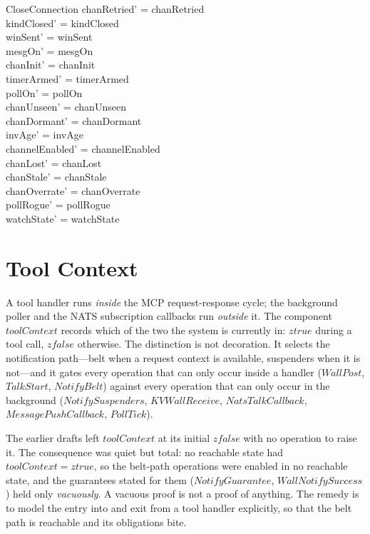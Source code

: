 \documentclass[a4paper,10pt,fleqn]{article}
\begin{document}
\begin{schema}{CloseConnection}
  chanRetried' = chanRetried \\
  kindClosed' = kindClosed \\
  winSent' = winSent \\
  mesgOn' = mesgOn \\
  chanInit' = chanInit \\
  timerArmed' = timerArmed \\
  pollOn' = pollOn \\
  chanUnseen' = chanUnseen \\
  chanDormant' = chanDormant \\
  invAge' = invAge \\
  channelEnabled' = channelEnabled \\
  chanLost' = chanLost \\
  chanStale' = chanStale \\
  chanOverrate' = chanOverrate \\
  pollRogue' = pollRogue \\
  watchState' = watchState
\end{schema}

\section{Tool Context}
\label{sec:toolcontext}

A tool handler runs \emph{inside} the MCP request-response cycle; the
background poller and the NATS subscription callbacks run \emph{outside}
it.  The component $toolContext$ records which of the two the system is
currently in: $ztrue$ during a tool call, $zfalse$ otherwise.  The
distinction is not decoration.  It selects the notification path---belt
when a request context is available, suspenders when it is not---and it
gates every operation that can only occur inside a handler ($WallPost$,
$TalkStart$, $NotifyBelt$) against every operation that can only occur
in the background ($NotifySuspenders$, $KVWallReceive$,
$NatsTalkCallback$, $MessagePushCallback$, $PollTick$).

The earlier drafts left $toolContext$ at its initial $zfalse$ with no
operation to raise it.  The consequence was quiet but total: no reachable
state had $toolContext = ztrue$, so the belt-path operations were enabled
in no reachable state, and the guarantees stated for them
($NotifyGuarantee$, $WallNotifySuccess$) held only \emph{vacuously}.  A
vacuous proof is not a proof of anything.  The remedy is to model the
entry into and exit from a tool handler explicitly, so that the belt path
is reachable and its obligations bite.
\end{document}
